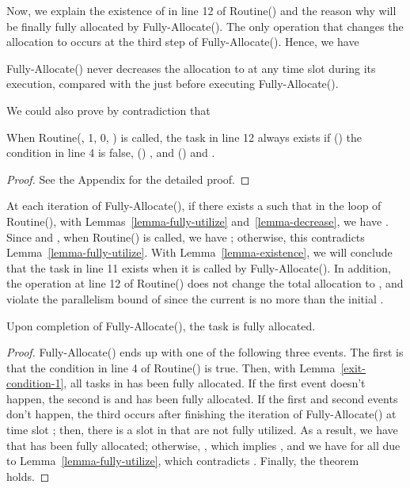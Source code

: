 \documentclass[10pt,journal,compsoc]{IEEEtran}
\newcommand{\rmnum}[1]{\romannumeral #1}
\begin{document}
Now, we explain the existence of  in line 12 of Routine() and the reason why  will be finally fully allocated by Fully-Allocate(). The only operation that changes the allocation to  occurs at the third step of Fully-Allocate(). Hence, we have
\begin{lemma}\label{lemma-decrease}
Fully-Allocate() never decreases the allocation  to  at any time slot  during its execution, compared with the  just before executing Fully-Allocate().
\end{lemma}



We could also prove by contradiction that
\begin{lemma}\label{lemma-existence}
When Routine(, 1, 0, ) is called, the task  in line 12 always exists if (\rmnum{1}) the condition in line 4 is false, (\rmnum{2}) , and (\rmnum{3})  and .
\end{lemma}
\begin{proof}
See the Appendix for the detailed proof.
\end{proof}



At each iteration of Fully-Allocate(), if there exists a  such that  in the loop of Routine(), with Lemmas~\ref{lemma-fully-utilize} and~\ref{lemma-decrease}, we have . Since  and , when Routine() is called, we have ; otherwise, this contradicts Lemma~\ref{lemma-fully-utilize}. With Lemma~\ref{lemma-existence}, we will conclude that the task  in line 11 exists when it is called by Fully-Allocate(). In addition, the operation at line 12 of Routine() does not change the total allocation to , and violate the parallelism bound  of  since the current  is no more than the initial .

\begin{proposition}\label{proposi-fully-allocate}
Upon completion of Fully-Allocate(), the task  is fully allocated.
\end{proposition}
\begin{proof}
Fully-Allocate() ends up with one of the following three events. The first is that the condition in line 4 of Routine() is true. Then, with Lemma~\ref{exit-condition-1}, all tasks in  has been fully allocated. If the first event doesn't happen, the second is  and  has been fully allocated. If the first and second events don't happen, the third occurs after finishing the iteration of Fully-Allocate() at time slot ; then, there is a slot  in  that are not fully utilized. As a result, we have that  has been fully allocated; otherwise, , which implies , and we have  for all  due to Lemma~\ref{lemma-fully-utilize}, which contradicts . Finally, the theorem holds.
\end{proof}
\end{document}
